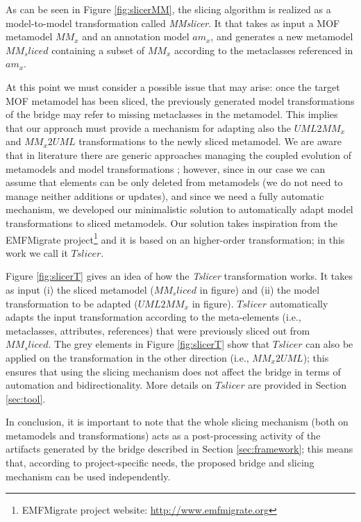 %
As can be seen in Figure \ref{fig:slicerMM}, the slicing algorithm is realized as a model-to-model transformation called \textit{MMslicer}.
It that takes as input a MOF metamodel $MM_x$ and an annotation model $am_x$, and generates a new metamodel $MM_sliced$ containing 
a subset of $MM_x$ according to the metaclasses referenced in $am_x$.

At this point we must consider a possible issue that may arise: once the target MOF metamodel has been sliced, the
previously generated model transformations of the bridge may refer to missing metaclasses in the metamodel.
This implies that our approach must provide a mechanism for adapting also the $UML2MM_x$ and $MM_x2UML$ transformations
to the newly sliced metamodel.
We are aware that in literature there are generic approaches managing the coupled evolution of metamodels and model transformations
\cite{TransEvolution}; however, since in our case we can assume that elements
can be only deleted from metamodels (we do not need to manage neither additions or updates), and since we need a fully automatic mechanism, we developed our minimalistic solution to automatically adapt model transformations to sliced metamodels.
Our solution takes inspiration from the EMFMigrate project\footnote{EMFMigrate project website: \small{\url{http://www.emfmigrate.org}}}
and it is based on an higher-order transformation; in this work we call it $Tslicer$.

Figure \ref{fig:slicerT} gives an idea of how the \textit{Tslicer} transformation works. It takes as input (i) the sliced metamodel
($MM_sliced$ in figure) and (ii) the model transformation to be adapted ($UML2MM_x$ in figure). $Tslicer$ automatically adapts the input transformation according to the meta-elements (i.e., metaclasses, attributes, references) 
that were previously sliced out from $MM_sliced$. The grey elements in Figure \ref{fig:slicerT} show that $Tslicer$ can also be
applied on the transformation in the other direction (i.e., $MM_x2UML$); this ensures that using the slicing mechanism does not affect
the bridge in terms of automation and bidirectionality. More details on $Tslicer$ are provided in Section \ref{sec:tool}.

In conclusion, it is important to note that the whole slicing mechanism (both on metamodels and transformations) 
acts as a post-processing activity of the artifacts generated by the bridge described in Section \ref{sec:framework}; this means that, according to project-specific needs, the proposed bridge and slicing mechanism can be used independently.


